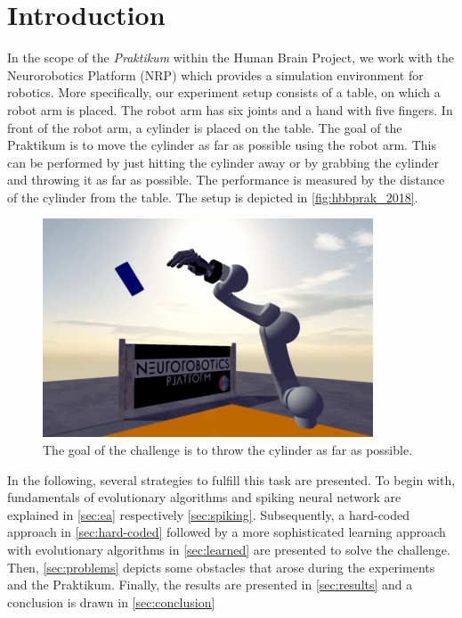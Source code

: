 \section{Introduction}
\label{sec:intro}
In the scope of the \textit{Praktikum} within the Human Brain Project, we work with the Neurorobotics Platform (NRP) which provides a simulation environment for robotics.
More specifically, our experiment setup consists of a table, on which a robot arm is placed.
The robot arm has six joints and a hand with five fingers.
In front of the robot arm, a cylinder is placed on the table.
The goal of the Praktikum is to move the cylinder as far as possible using the robot arm.
This can be performed by just hitting the cylinder away or by grabbing the cylinder and throwing it as far as possible.
The performance is measured by the distance of the cylinder from the table.
The setup is depicted in \autoref{fig:hbbprak_2018}.

\begin{figure}[h]
\centering
\includegraphics[width=.95\columnwidth]{figures/hbpprak_2018.png}
\caption{The goal of the challenge is to throw the cylinder as far as possible.}
\label{fig:hbbprak_2018}
\end{figure}

In the following, several strategies to fulfill this task are presented.
To begin with, fundamentals of evolutionary algorithms and spiking neural network are explained in \autoref{sec:ea} respectively \autoref{sec:spiking}.
Subsequently, a hard-coded approach in \autoref{sec:hard-coded} followed by a more sophisticated learning approach with evolutionary algorithms in \autoref{sec:learned} are presented to solve the challenge.
Then, \autoref{sec:problems} depicts some obstacles that arose during the experiments and the Praktikum.
Finally, the results are presented in \autoref{sec:results} and a conclusion is drawn in \autoref{sec:conclusion}
